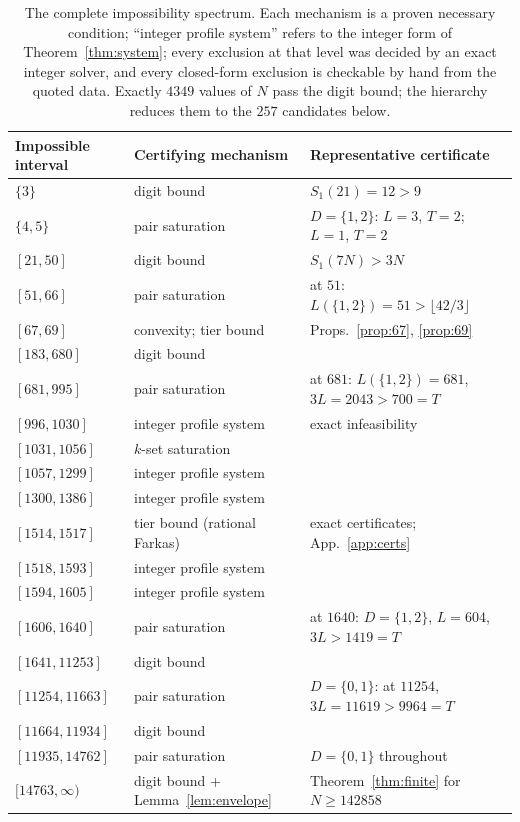 \documentclass[11pt]{article}
\theoremstyle{definition}
\theoremstyle{remark}
\newcommand{\Sd}[2]{S_{#1}(#2)}
\begin{document}
\begin{table}[ht]
\centering
\small
\begin{tabular}{@{}lll@{}}
\toprule
Impossible interval & Certifying mechanism & Representative certificate \\
\midrule
$\{3\}$ & digit bound & $\Sd{1}{21}=12>9$ \\
$\{4,5\}$ & pair saturation & $D{=}\{1,2\}$: $L{=}3$, $T{=}2$; \ $L{=}1$, $T{=}2$ \\
$[21,50]$ & digit bound & $\Sd{1}{7N}>3N$ \\
$[51,66]$ & pair saturation & at $51$: $L(\{1,2\}){=}51>\lfloor 42/3\rfloor$ \\
$[67,69]$ & convexity; tier bound & Props.~\ref{prop:67}, \ref{prop:69} \\
$[183,680]$ & digit bound & \\
$[681,995]$ & pair saturation & at $681$: $L(\{1,2\}){=}681$, $3L{=}2043>700{=}T$ \\
$[996,1030]$ & integer profile system & exact infeasibility \\
$[1031,1056]$ & $k$-set saturation & \\
$[1057,1299]$ & integer profile system & \\
$[1300,1386]$ & integer profile system & \\
$[1514,1517]$ & tier bound (rational Farkas) & exact certificates; App.~\ref{app:certs} \\
$[1518,1593]$ & integer profile system & \\
$[1594,1605]$ & integer profile system & \\
$[1606,1640]$ & pair saturation & at $1640$: $D{=}\{1,2\}$, $L{=}604$, $3L>1419{=}T$ \\
$[1641,11253]$ & digit bound & \\
$[11254,11663]$ & pair saturation & $D{=}\{0,1\}$: at $11254$, $3L{=}11619>9964{=}T$ \\
$[11664,11934]$ & digit bound & \\
$[11935,14762]$ & pair saturation & $D{=}\{0,1\}$ throughout \\
$[14763,\infty)$ & digit bound + Lemma~\ref{lem:envelope} & Theorem~\ref{thm:finite} for $N\ge 142858$ \\
\bottomrule
\end{tabular}
\caption{The complete impossibility spectrum. Each mechanism is a proven necessary condition; ``integer profile system'' refers to the integer form of Theorem~\ref{thm:system}; every exclusion at that level was decided by an exact integer solver, and every closed-form exclusion is checkable by hand from the quoted data. Exactly $4349$ values of $N$ pass the digit bound; the hierarchy reduces them to the $257$ candidates below.}
\label{tab:spectrum}
\end{table}
\end{document}
